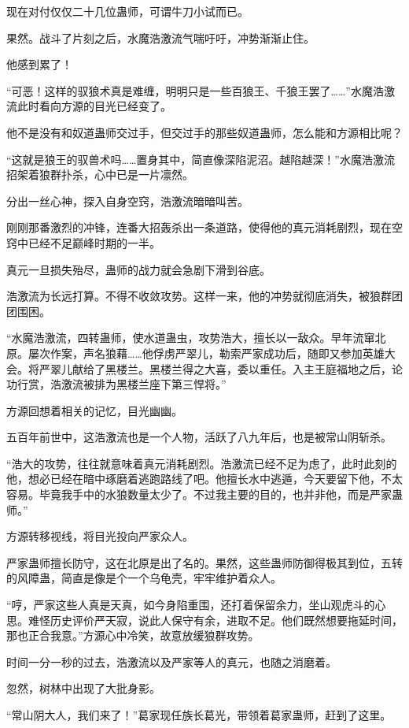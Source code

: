 \begin{this_body}
现在对付仅仅二十几位蛊师，可谓牛刀小试而已。

果然。战斗了片刻之后，水魔浩激流气喘吁吁，冲势渐渐止住。

他感到累了！

“可恶！这样的驭狼术真是难缠，明明只是一些百狼王、千狼王罢了……”水魔浩激流此时看向方源的目光已经变了。

他不是没有和奴道蛊师交过手，但交过手的那些奴道蛊师，怎么能和方源相比呢？

“这就是狼王的驭兽术吗……置身其中，简直像深陷泥沼。越陷越深！”水魔浩激流招架着狼群扑杀，心中已是一片凛然。

分出一丝心神，探入自身空窍，浩激流暗暗叫苦。

刚刚那番激烈的冲锋，连番大招轰杀出一条道路，使得他的真元消耗剧烈，现在空窍中已经不足巅峰时期的一半。

真元一旦损失殆尽，蛊师的战力就会急剧下滑到谷底。

浩激流为长远打算。不得不收敛攻势。这样一来，他的冲势就彻底消失，被狼群团团围困。

“水魔浩激流，四转蛊师，使水道蛊虫，攻势浩大，擅长以一敌众。早年流窜北原。屡次作案，声名狼藉……他俘虏严翠儿，勒索严家成功后，随即又参加英雄大会。将严翠儿献给了黑楼兰。黑楼兰得之大喜，委以重任。入主王庭福地之后，论功行赏，浩激流被排为黑楼兰座下第三悍将。”

方源回想着相关的记忆，目光幽幽。

五百年前世中，这浩激流也是一个人物，活跃了八九年后，也是被常山阴斩杀。

“浩大的攻势，往往就意味着真元消耗剧烈。浩激流已经不足为虑了，此时此刻的他，想必已经在暗中琢磨着逃跑路线了吧。他擅长水中逃遁，今天要留下他，不太容易。毕竟我手中的水狼数量太少了。不过我主要的目的，也并非他，而是严家蛊师。”

方源转移视线，将目光投向严家众人。

严家蛊师擅长防守，这在北原是出了名的。果然，这些蛊师防御得极其到位，五转的风障蛊，简直是像是个一个乌龟壳，牢牢维护着众人。

“哼，严家这些人真是天真，如今身陷重围，还打着保留余力，坐山观虎斗的心思。难怪历史评价严天寂，说此人保守有余，进取不足。他们既然想要拖延时间，那也正合我意。”方源心中冷笑，故意放缓狼群攻势。

时间一分一秒的过去，浩激流以及严家等人的真元，也随之消磨着。

忽然，树林中出现了大批身影。

“常山阴大人，我们来了！”葛家现任族长葛光，带领着葛家蛊师，赶到了这里。


\end{this_body}
